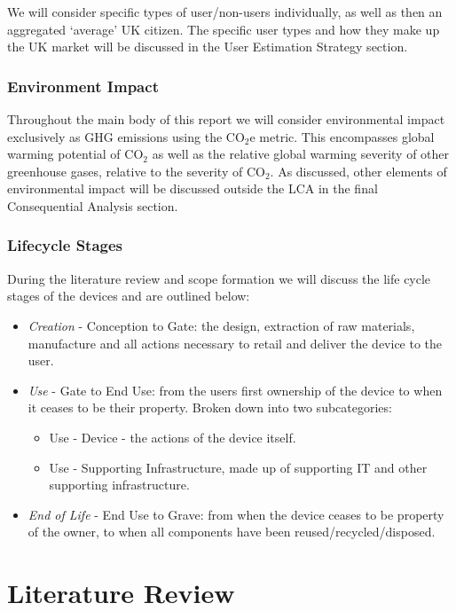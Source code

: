 \documentclass[conference]{IEEEtran}
\begin{document}
We will consider specific types of user/non-users individually, as
well as then an aggregated `average' UK citizen. The specific user
types and how they make up the UK market will be discussed in the User
Estimation Strategy section.

\subsubsection{Environment Impact}

Throughout the main body of this report we will consider environmental
impact exclusively as GHG emissions using the CO$_2$e metric. This
encompasses global warming potential of CO$_2$ as well as the relative
global warming severity of other greenhouse gases, relative to the
severity of CO$_2$. As discussed, other elements of environmental impact
will be discussed outside the LCA in the final Consequential Analysis
section.

\subsubsection{Lifecycle Stages}

During the literature review and scope formation we will discuss the
life cycle stages of the devices and are outlined below:

\begin{itemize}
\item {\emph{Creation}} - Conception to Gate: the design, extraction of raw
  materials, manufacture and all actions necessary to retail and
  deliver the device to the user.
\item {\emph{Use}} - Gate to End Use: from the users first ownership
  of the device to when it ceases to be their property. Broken down
  into two subcategories:
\begin{itemize}
\item Use - Device - the actions of the device itself.
\item Use - Supporting Infrastructure, made up of supporting IT and
  other supporting infrastructure.
\end{itemize}
\item {\emph{End of Life}} - End Use to Grave: from when the device
  ceases to be property of the owner, to when all components have been
  reused/recycled/disposed.
\end{itemize}


\section{Literature Review}
\end{document}
